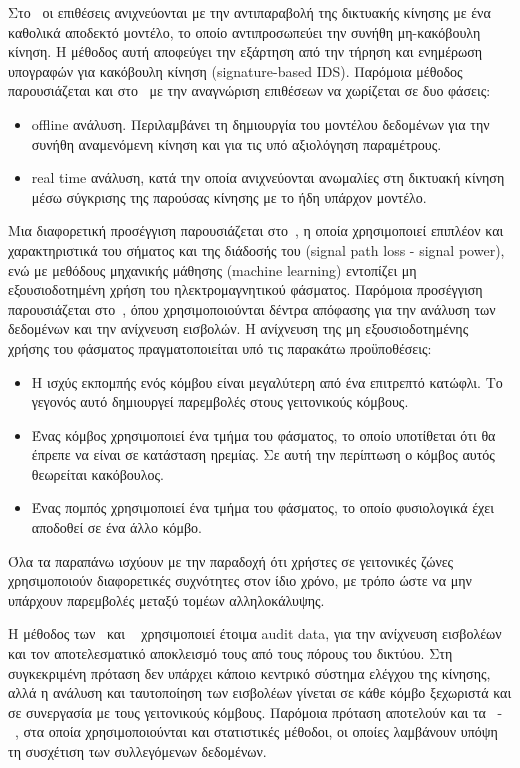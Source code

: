 \documentclass[12pt]{report}
\begin{document}
Στο~\cite{paper:03} οι επιθέσεις ανιχνεύονται με την αντιπαραβολή της δικτυακής κίνησης με ένα καθολικά αποδεκτό μοντέλο, το οποίο αντιπροσωπεύει την συνήθη μη-κακόβουλη κίνηση. Η μέθοδος αυτή αποφεύγει την εξάρτηση από την τήρηση και ενημέρωση υπογραφών για κακόβουλη κίνηση (\textlatin{signature-based IDS}). Παρόμοια μέθοδος παρουσιάζεται και στο~\cite{paper:04} με την αναγνώριση επιθέσεων να χωρίζεται σε δυο φάσεις:
\begin{itemize}
  \item \textlatin{offline} ανάλυση. Περιλαμβάνει τη δημιουργία του μοντέλου δεδομένων για την συνήθη αναμενόμενη κίνηση και για τις υπό αξιολόγηση παραμέτρους.
  \item \textlatin{real time} ανάλυση, κατά την οποία ανιχνεύονται ανωμαλίες στη δικτυακή κίνηση μέσω σύγκρισης της παρούσας κίνησης με το ήδη υπάρχον μοντέλο.
\end{itemize}

Μια διαφορετική προσέγγιση παρουσιάζεται στο~\cite{paper:06}, η οποία χρησιμοποιεί επιπλέον και χαρακτηριστικά του σήματος και της διάδοσής του (\textlatin{signal path loss - signal power}), ενώ με μεθόδους μηχανικής μάθησης (\textlatin{machine learning}) εντοπίζει μη εξουσιοδοτημένη χρήση του ηλεκτρομαγνητικού φάσματος. Παρόμοια προσέγγιση παρουσιάζεται στο~\cite{paper:13}, όπου χρησιμοποιούνται δέντρα απόφασης για την ανάλυση των δεδομένων και την ανίχνευση εισβολών. Η ανίχνευση της μη εξουσιοδοτημένης χρήσης του φάσματος πραγματοποιείται υπό τις παρακάτω προϋποθέσεις:
\begin{itemize}
  \item Η ισχύς εκπομπής ενός κόμβου είναι μεγαλύτερη από ένα επιτρεπτό κατώφλι. Το γεγονός αυτό δημιουργεί παρεμβολές στους γειτονικούς κόμβους.
  \item Ένας κόμβος χρησιμοποιεί ένα τμήμα του φάσματος, το οποίο υποτίθεται ότι θα έπρεπε να είναι σε κατάσταση ηρεμίας. Σε αυτή την περίπτωση ο κόμβος αυτός θεωρείται κακόβουλος.
  \item Ένας πομπός χρησιμοποιεί ένα τμήμα του φάσματος, το οποίο φυσιολογικά έχει αποδοθεί σε ένα άλλο κόμβο.
\end{itemize}
Όλα τα παραπάνω ισχύουν με την παραδοχή ότι χρήστες σε γειτονικές ζώνες χρησιμοποιούν διαφορετικές συχνότητες στον ίδιο χρόνο, με τρόπο ώστε να μην υπάρχουν παρεμβολές μεταξύ τομέων αλληλοκάλυψης.

Η μέθοδος των~\cite{paper:07} και ~\cite{paper:08} χρησιμοποιεί έτοιμα \textlatin{audit data}, για την ανίχνευση εισβολέων και τον αποτελεσματικό αποκλεισμό τους από τους πόρους του δικτύου. Στη συγκεκριμένη πρόταση δεν υπάρχει κάποιο κεντρικό σύστημα ελέγχου της κίνησης, αλλά η ανάλυση και ταυτοποίηση των εισβολέων γίνεται σε κάθε κόμβο ξεχωριστά και σε συνεργασία με τους γειτονικούς κόμβους. Παρόμοια πρόταση αποτελούν και τα~\cite{paper:09} -~\cite{paper:10}, στα οποία χρησιμοποιούνται και στατιστικές μέθοδοι, οι οποίες λαμβάνουν υπόψη τη συσχέτιση των συλλεγόμενων δεδομένων.
\end{document}
